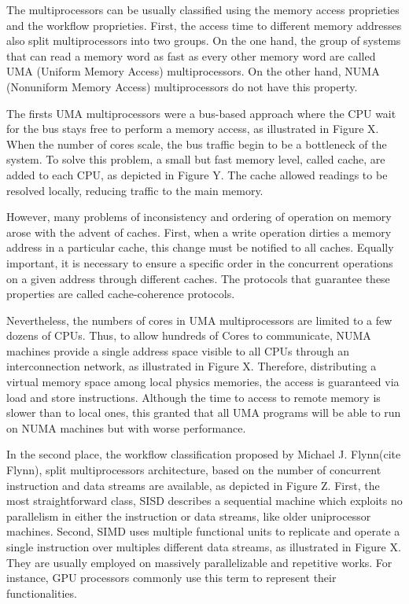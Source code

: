 		The multiprocessors can be usually classified using the memory access
		proprieties and the workflow proprieties.
		First, the access time to different memory addresses also split
		multiprocessors into two groups.
		On the one hand, the group of systems that can read a memory word as fast
		as every other memory word are called UMA (Uniform Memory Access) multiprocessors.
		On the other hand, NUMA (Nonuniform Memory Access) multiprocessors do not have this property.
		
		The firsts UMA multiprocessors were a bus-based approach where the CPU wait for
		the bus stays free to perform a memory access, as illustrated in Figure X.
		When the number of cores scale, the bus traffic begin to be a bottleneck of the system.
		To solve this problem, a small but fast memory level, called cache, are added to each
		CPU, as depicted in Figure Y.
		The cache allowed readings to be resolved locally, reducing traffic to the main memory.
		
		However, many problems of inconsistency and ordering of operation on memory arose with
		the advent of caches.
		First, when a write operation dirties a memory address in a particular cache, this
		change must be notified to all caches.
		Equally important, it is necessary to ensure a specific order in the concurrent
		operations on a given address through different caches.
		The protocols that guarantee these properties are called cache-coherence protocols.
		
		Nevertheless, the numbers of cores in UMA multiprocessors are limited to a few dozens of CPUs.
		Thus, to allow hundreds of Cores to communicate, NUMA machines provide a single address
		space visible to all CPUs through an interconnection network, as illustrated in Figure X.
		Therefore, distributing a virtual memory space among local physics memories, the access
		is guaranteed via load and store instructions.
		Although the time to access to remote memory is slower than to local ones, this granted
		that all UMA programs will be able to run on NUMA machines but with worse performance.
		
		In the second place, the workflow classification proposed by Michael J. Flynn(cite Flynn),
		split multiprocessors architecture, based on the number of concurrent instruction
		and data streams are available, as depicted in Figure Z.
		First, the most straightforward class, SISD describes a sequential machine which
		exploits no parallelism in either the instruction or data streams, like older
		uniprocessor machines.
		Second, SIMD uses multiple functional units to replicate and operate a single instruction
		over multiples different data streams, as illustrated in Figure X.
		They are usually employed on massively parallelizable and repetitive works.
		For instance, GPU processors commonly use this term to represent their functionalities.
		

